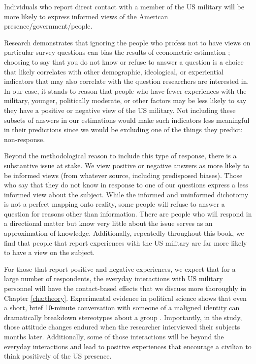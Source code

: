 \begin{subhyp}
	
	\begin{hyp}
		Individuals who report direct contact with a member of the US military will be more likely to express informed views of the American presence/government/people. 
	\end{hyp}
	
	Research demonstrates that ignoring the people who profess not to have views on particular survey questions can bias the results of econometric estimation \cite{Kleinberg2018}; choosing to say that you do not know or refuse to answer a question is a choice that likely correlates with other demographic, ideological, or experiential indicators that may also correlate with the question researchers are interested in. In our case, it stands to reason that people who have fewer experiences with the military, younger, politically moderate, or other factors may be less likely to say they have a positive or negative view of the US military. Not including these subsets of answers in our estimations would make such indicators less meaningful in their predictions since we would be excluding one of the things they predict: non-response.
	
	Beyond the methodological reason to include this type of response, there is a substantive issue at stake. We view positive or negative answers as more likely to be informed views (from whatever source, including predisposed biases). Those who say that they do not know in response to one of our questions express a less informed view about the subject. While the informed and uninformed dichotomy is not a perfect mapping onto reality, some people will refuse to answer a question for reasons other than information. There are people who will respond in a directional matter but know very little about the issue serves as an approximation of knowledge. Additionally, repeatedly throughout this book, we find that people that report experiences with the US military are far more likely to have a view on the subject.
	
	For those that report positive and negative experiences, we expect that for a large number of respondents, the everyday interactions with US military personnel will have the contact-based effects that we discuss more thoroughly in Chapter \ref{cha:theory}. Experimental evidence in political science shows that even a short, brief 10-minute conversation with someone of a maligned identity can dramatically breakdown stereotypes about a group \cite{Broockman2016}. Importantly, in the  study, those attitude changes endured when the researcher interviewed their subjects months later. Additionally, some of those interactions will be beyond the everyday interactions and lead to positive experiences that encourage a civilian to think positively of the US presence.
	

\end{subhyp}
